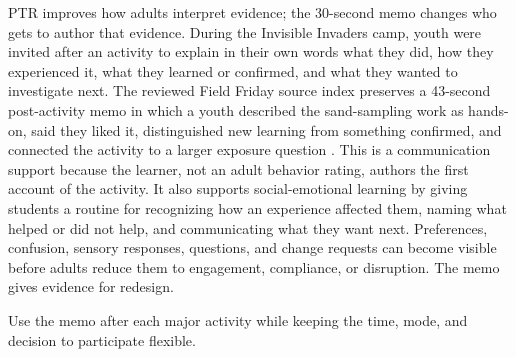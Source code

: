 
\vspace{-0.5cm}

PTR improves how adults interpret evidence; the 30-second memo changes who gets to author that evidence. During the Invisible Invaders camp, youth were invited after an activity to explain in their own words what they did, how they experienced it, what they learned or confirmed, and what they wanted to investigate next. The reviewed Field Friday source index preserves a 43-second post-activity memo in which a youth described the sand-sampling work as hands-on, said they liked it, distinguished new learning from something confirmed, and connected the activity to a larger exposure question \citep{campEvidence2026}. This is a communication support because the learner, not an adult behavior rating, authors the first account of the activity. It also supports social-emotional learning by giving students a routine for recognizing how an experience affected them, naming what helped or did not help, and communicating what they want next. Preferences, confusion, sensory responses, questions, and change requests can become visible before adults reduce them to engagement, compliance, or disruption. The memo gives evidence for redesign.


Use the memo after each major activity while keeping the time, mode, and decision to participate flexible.

\renewcommand{\arraystretch}{1.00}
\setlength{\tabcolsep}{3pt}

